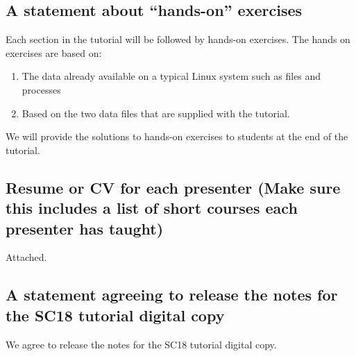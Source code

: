 \documentclass{report}
\begin{document}
\subsection*{A statement about ``hands-on'' exercises}
Each section in the tutorial will be followed by hands-on exercises. The hands on exercises are based on:
\begin{enumerate}
\item The data already available on a
typical Linux system such as files and processes
\item Based on the two data
files that are supplied with the tutorial.
\end{enumerate}
We will provide the solutions to hands-on exercises to students at the end of the tutorial.

\subsection*{Resume or CV for each presenter (Make sure this includes a list of short courses each presenter has taught)}
Attached.
\subsection*{A statement agreeing to release the notes for the SC18 tutorial digital copy}
We agree to release the notes for the SC18 tutorial digital copy.
\end{document}
